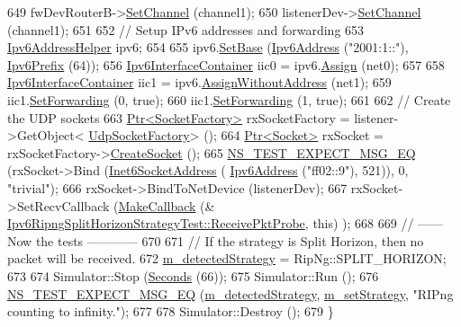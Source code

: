 \begin{DoxyCode}
649   fwDevRouterB->\hyperlink{classns3_1_1SimpleNetDevice_af9e9828ad584b5ba538f18f645f162e0}{SetChannel} (channel1);
650   listenerDev->\hyperlink{classns3_1_1SimpleNetDevice_af9e9828ad584b5ba538f18f645f162e0}{SetChannel} (channel1);
651 
652   \textcolor{comment}{// Setup IPv6 addresses and forwarding}
653   \hyperlink{classns3_1_1Ipv6AddressHelper}{Ipv6AddressHelper} ipv6;
654 
655   ipv6.\hyperlink{classns3_1_1Ipv6AddressHelper_a13467412e9da6263395c09460681c0f1}{SetBase} (\hyperlink{classns3_1_1Ipv6Address}{Ipv6Address} (\textcolor{stringliteral}{"2001:1::"}), \hyperlink{classns3_1_1Ipv6Prefix}{Ipv6Prefix} (64));
656   \hyperlink{classns3_1_1Ipv6InterfaceContainer}{Ipv6InterfaceContainer} iic0 = ipv6.\hyperlink{classns3_1_1Ipv6AddressHelper_aad4685588aea1757beaf881bc4157912}{Assign} (net0);
657 
658   \hyperlink{classns3_1_1Ipv6InterfaceContainer}{Ipv6InterfaceContainer} iic1 = ipv6.\hyperlink{classns3_1_1Ipv6AddressHelper_a11d807b801198006c7be96bac61d44ac}{AssignWithoutAddress} (net1);
659   iic1.\hyperlink{classns3_1_1Ipv6InterfaceContainer_a080aad6f43a52c6478053b237e5e6979}{SetForwarding} (0, \textcolor{keyword}{true});
660   iic1.\hyperlink{classns3_1_1Ipv6InterfaceContainer_a080aad6f43a52c6478053b237e5e6979}{SetForwarding} (1, \textcolor{keyword}{true});
661 
662   \textcolor{comment}{// Create the UDP sockets}
663   \hyperlink{classns3_1_1Ptr}{Ptr<SocketFactory>} rxSocketFactory = listener->GetObject<
      \hyperlink{classns3_1_1UdpSocketFactory}{UdpSocketFactory}> ();
664   \hyperlink{classns3_1_1Ptr}{Ptr<Socket>} rxSocket = rxSocketFactory->\hyperlink{classns3_1_1SocketFactory_a97351e6e7860503a4912042530449f62}{CreateSocket} ();
665   \hyperlink{group__testing_ga7304ba46a28d8cf08dfdfd6499cf7068}{NS\_TEST\_EXPECT\_MSG\_EQ} (rxSocket->Bind (\hyperlink{classns3_1_1Inet6SocketAddress}{Inet6SocketAddress} (
      \hyperlink{classns3_1_1Ipv6Address}{Ipv6Address} (\textcolor{stringliteral}{"ff02::9"}), 521)), 0, \textcolor{stringliteral}{"trivial"});
666   rxSocket->BindToNetDevice (listenerDev);
667   rxSocket->SetRecvCallback (\hyperlink{group__makecallbackmemptr_ga9376283685aa99d204048d6a4b7610a4}{MakeCallback} (&
      \hyperlink{classIpv6RipngSplitHorizonStrategyTest_ad4f2c6c48e7eca051598285035aaf8ec}{Ipv6RipngSplitHorizonStrategyTest::ReceivePktProbe}, \textcolor{keyword}{this})
      );
668 
669   \textcolor{comment}{// ------ Now the tests ------------}
670 
671   \textcolor{comment}{// If the strategy is Split Horizon, then no packet will be received.}
672   \hyperlink{classIpv6RipngSplitHorizonStrategyTest_a67c77e54ff8eccc14b3d197dbff2a8f7}{m\_detectedStrategy} = RipNg::SPLIT\_HORIZON;
673 
674   Simulator::Stop (\hyperlink{group__timecivil_ga33c34b816f8ff6628e33d5c8e9713b9e}{Seconds} (66));
675   Simulator::Run ();
676   \hyperlink{group__testing_ga7304ba46a28d8cf08dfdfd6499cf7068}{NS\_TEST\_EXPECT\_MSG\_EQ} (\hyperlink{classIpv6RipngSplitHorizonStrategyTest_a67c77e54ff8eccc14b3d197dbff2a8f7}{m\_detectedStrategy}, 
      \hyperlink{classIpv6RipngSplitHorizonStrategyTest_a5c2358f181884a3e4edbe045f839246a}{m\_setStrategy}, \textcolor{stringliteral}{"RIPng counting to infinity."});
677 
678   Simulator::Destroy ();
679 \}
\end{DoxyCode}


